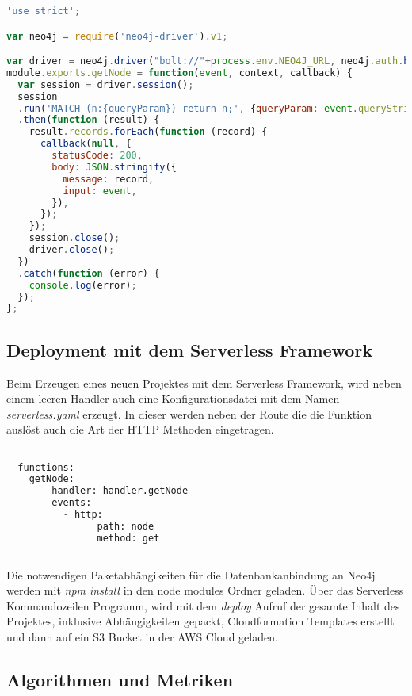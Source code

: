 \begin{lstlisting}[language=JavaScript, frame=htrbl, caption={Lambda Handler Funktion}, label={lst:lambda_handler}]
	'use strict';

var neo4j = require('neo4j-driver').v1;

var driver = neo4j.driver("bolt://"+process.env.NEO4J_URL, neo4j.auth.basic("user" ,"password"));
module.exports.getNode = function(event, context, callback) {
  var session = driver.session();
  session
  .run('MATCH (n:{queryParam}) return n;', {queryParam: event.queryStringParameters.label})
  .then(function (result) {
    result.records.forEach(function (record) {
      callback(null, {
        statusCode: 200,
        body: JSON.stringify({
          message: record,
          input: event,
        }),
      });
    });
    session.close();
    driver.close();
  })
  .catch(function (error) {
    console.log(error);
  });
};


\end{lstlisting}


\subsection{Deployment mit dem Serverless Framework}

Beim Erzeugen eines neuen Projektes mit dem Serverless Framework, wird neben einem leeren Handler auch eine Konfigurationsdatei mit dem Namen \textit{serverless.yaml} erzeugt. In dieser werden neben der Route die die Funktion auslöst auch die Art der HTTP Methoden eingetragen.

\begin{lstlisting}[language=Python, frame=htrbl, caption={Serverless Konfiguration}, label={lst:serverless_yaml}]

  functions:
  	getNode:
    	handler: handler.getNode
    	events: 
          - http: 
            	path: node 
         		method: get 
         		
\end{lstlisting}

Die notwendigen Paketabhängikeiten für die Datenbankanbindung an Neo4j werden mit \textit{npm install} in den node modules Ordner geladen. Über das Serverless Kommandozeilen Programm, wird mit dem \textit{deploy} Aufruf der gesamte Inhalt des Projektes, inklusive Abhängigkeiten gepackt, Cloudformation Templates erstellt und dann auf ein S3 Bucket in der AWS Cloud geladen. 

\subsection{Algorithmen und Metriken}

